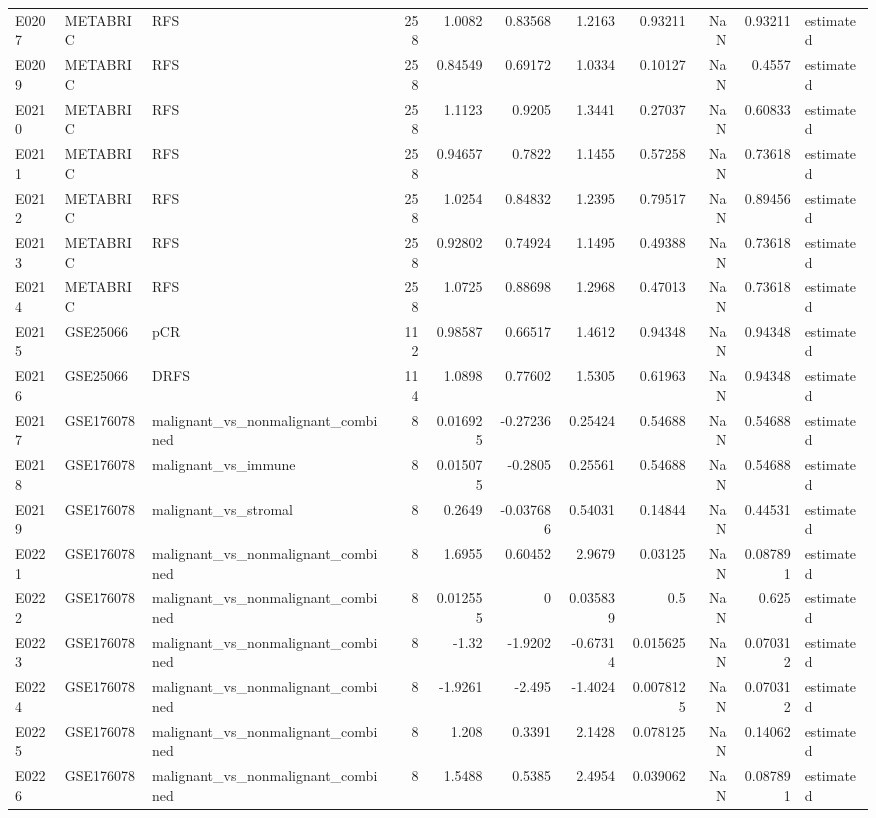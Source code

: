 \begin{longtable}{lllrrrrrrrl}
E0207 & METABRIC & RFS & 258 & 1.0082 & 0.83568 & 1.2163 & 0.93211 & NaN & 0.93211 & estimated \\
E0209 & METABRIC & RFS & 258 & 0.84549 & 0.69172 & 1.0334 & 0.10127 & NaN & 0.4557 & estimated \\
E0210 & METABRIC & RFS & 258 & 1.1123 & 0.9205 & 1.3441 & 0.27037 & NaN & 0.60833 & estimated \\
E0211 & METABRIC & RFS & 258 & 0.94657 & 0.7822 & 1.1455 & 0.57258 & NaN & 0.73618 & estimated \\
E0212 & METABRIC & RFS & 258 & 1.0254 & 0.84832 & 1.2395 & 0.79517 & NaN & 0.89456 & estimated \\
E0213 & METABRIC & RFS & 258 & 0.92802 & 0.74924 & 1.1495 & 0.49388 & NaN & 0.73618 & estimated \\
E0214 & METABRIC & RFS & 258 & 1.0725 & 0.88698 & 1.2968 & 0.47013 & NaN & 0.73618 & estimated \\
E0215 & GSE25066 & pCR & 112 & 0.98587 & 0.66517 & 1.4612 & 0.94348 & NaN & 0.94348 & estimated \\
E0216 & GSE25066 & DRFS & 114 & 1.0898 & 0.77602 & 1.5305 & 0.61963 & NaN & 0.94348 & estimated \\
E0217 & GSE176078 & malignant\_vs\_nonmalignant\_combined & 8 & 0.016925 & -0.27236 & 0.25424 & 0.54688 & NaN & 0.54688 & estimated \\
E0218 & GSE176078 & malignant\_vs\_immune & 8 & 0.015075 & -0.2805 & 0.25561 & 0.54688 & NaN & 0.54688 & estimated \\
E0219 & GSE176078 & malignant\_vs\_stromal & 8 & 0.2649 & -0.037686 & 0.54031 & 0.14844 & NaN & 0.44531 & estimated \\
E0221 & GSE176078 & malignant\_vs\_nonmalignant\_combined & 8 & 1.6955 & 0.60452 & 2.9679 & 0.03125 & NaN & 0.087891 & estimated \\
E0222 & GSE176078 & malignant\_vs\_nonmalignant\_combined & 8 & 0.012555 & 0 & 0.035839 & 0.5 & NaN & 0.625 & estimated \\
E0223 & GSE176078 & malignant\_vs\_nonmalignant\_combined & 8 & -1.32 & -1.9202 & -0.67314 & 0.015625 & NaN & 0.070312 & estimated \\
E0224 & GSE176078 & malignant\_vs\_nonmalignant\_combined & 8 & -1.9261 & -2.495 & -1.4024 & 0.0078125 & NaN & 0.070312 & estimated \\
E0225 & GSE176078 & malignant\_vs\_nonmalignant\_combined & 8 & 1.208 & 0.3391 & 2.1428 & 0.078125 & NaN & 0.14062 & estimated \\
E0226 & GSE176078 & malignant\_vs\_nonmalignant\_combined & 8 & 1.5488 & 0.5385 & 2.4954 & 0.039062 & NaN & 0.087891 & estimated \\

\end{longtable}

